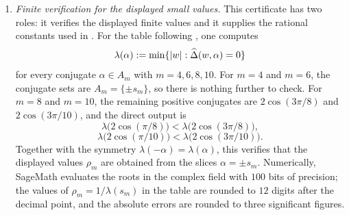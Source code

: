 \begin{enumerate}[label=(\alph*)]
  \item \textit{Finite verification for the displayed small values.}\quad
    This certificate has two roles: it verifies the displayed finite
    values and it supplies the rational constants used in
    . For the table following
    , one computes
    \[
      \lambda(\alpha):=\min\{\lvert w \rvert:\widehat\Delta(w,\alpha)=0\}
    \]
    for every conjugate \(\alpha\in A_m\) with \(m=4,6,8,10\). For
    \(m=4\) and \(m=6\), the conjugate sets are
    \(A_m=\{\pm s_m\}\), so there is nothing further to check. For
    \(m=8\) and \(m=10\), the remaining positive conjugates are
    \(2\cos(3\pi/8)\) and \(2\cos(3\pi/10)\), and the direct output is
    \[
      \lambda\!\bigl(2\cos(\pi/8)\bigr)
      < \lambda\!\bigl(2\cos(3\pi/8)\bigr),
    \]
    \[
      \lambda\!\bigl(2\cos(\pi/10)\bigr)
      < \lambda\!\bigl(2\cos(3\pi/10)\bigr).
    \]
    Together with the symmetry \(\lambda(-\alpha)=\lambda(\alpha)\),
    this verifies that the displayed values \(\rho_m\) are obtained from
    the slices \(\alpha=\pm s_m\). Numerically, SageMath evaluates
    the roots in the complex field with \(100\) bits of precision; the
    values of \(\rho_m=1/\lambda(s_m)\) in the table are rounded to
    \(12\) digits after the decimal point, and the absolute errors are
    rounded to three significant figures.


\end{enumerate}
